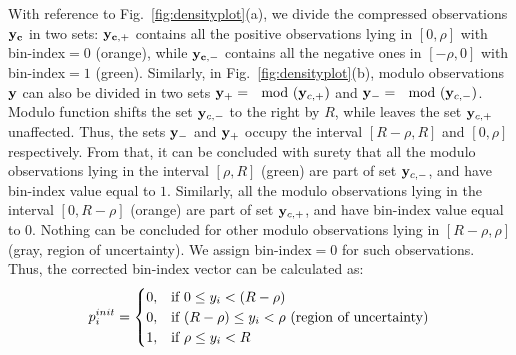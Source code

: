 With reference to Fig.~\ref{fig:densityplot}(a), we divide the compressed observations $\mathbf{y_c}$ in two sets: $\mathbf{y_{c,+}}$ contains all the positive observations lying in $[0,\rho]$ with bin-index$=0$ (orange), while $\mathbf{y_{c,-}}$ contains all the negative ones in $[-\rho,0]$ with bin-index$=1$ (green). Similarly, in Fig.~\ref{fig:densityplot}(b), modulo observations $\mathbf{y}$ can also be divided in two sets $\mathbf{y}_+ = \mod(\mathbf{y}_{c,+})$ and $\mathbf{y}_- = \mod(\mathbf{y}_{c,-})$. Modulo function shifts the set $\mathbf{y}_{c,-}$ to the right by $R$, while leaves the set $\mathbf{y}_{c,+}$ unaffected. Thus, the sets $\mathbf{y}_-$ and $\mathbf{y}_+$ occupy the interval $[R-\rho,R]$ and $[0,\rho]$ respectively. From that, it can be concluded with surety that all the modulo observations lying in the interval $[\rho, R]$ (green) are part of set $\mathbf{y}_{c,-}$, and have bin-index value equal to $1$. Similarly, all the modulo observations lying in the interval $[0,R-\rho]$ (orange) are part of set $\mathbf{y}_{c,+}$, and have bin-index value equal to $0$. Nothing can be concluded for other modulo observations lying in $[R-\rho,\rho]$ (gray, region of uncertainty). We assign bin-index$=0$ for such observations. Thus, the corrected bin-index vector can be calculated as:
\begin{equation}
{p}^{init}_{i} = 
\begin{cases}
0,& \text{if } 0\leq y_i < (R-\rho) \\
0,& \text{if } (R-\rho)\leq y_i < \rho ~ \textnormal{(region of uncertainty)} \\
1,& \text{if } \rho \leq y_i < R \\
\end{cases}
\label{eq:rcm}
\end{equation}
